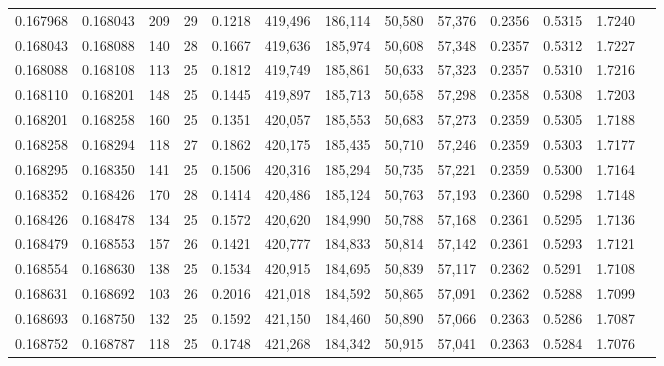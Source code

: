 \begin{tabular}{rrrrrrrrrrrrr}
0.167968 & 0.168043 & 209 &  29 &                                     0.1218 & 419,496 & 186,114 &  50,580 &  57,376 & 0.2356 & 0.5315 & 1.7240 \\
0.168043 & 0.168088 & 140 &  28 &                                     0.1667 & 419,636 & 185,974 &  50,608 &  57,348 & 0.2357 & 0.5312 & 1.7227 \\
0.168088 & 0.168108 & 113 &  25 &                                     0.1812 & 419,749 & 185,861 &  50,633 &  57,323 & 0.2357 & 0.5310 & 1.7216 \\
0.168110 & 0.168201 & 148 &  25 &                                     0.1445 & 419,897 & 185,713 &  50,658 &  57,298 & 0.2358 & 0.5308 & 1.7203 \\
0.168201 & 0.168258 & 160 &  25 &                                     0.1351 & 420,057 & 185,553 &  50,683 &  57,273 & 0.2359 & 0.5305 & 1.7188 \\
0.168258 & 0.168294 & 118 &  27 &                                     0.1862 & 420,175 & 185,435 &  50,710 &  57,246 & 0.2359 & 0.5303 & 1.7177 \\
0.168295 & 0.168350 & 141 &  25 &                                     0.1506 & 420,316 & 185,294 &  50,735 &  57,221 & 0.2359 & 0.5300 & 1.7164 \\
0.168352 & 0.168426 & 170 &  28 &                                     0.1414 & 420,486 & 185,124 &  50,763 &  57,193 & 0.2360 & 0.5298 & 1.7148 \\
0.168426 & 0.168478 & 134 &  25 &                                     0.1572 & 420,620 & 184,990 &  50,788 &  57,168 & 0.2361 & 0.5295 & 1.7136 \\
0.168479 & 0.168553 & 157 &  26 &                                     0.1421 & 420,777 & 184,833 &  50,814 &  57,142 & 0.2361 & 0.5293 & 1.7121 \\
0.168554 & 0.168630 & 138 &  25 &                                     0.1534 & 420,915 & 184,695 &  50,839 &  57,117 & 0.2362 & 0.5291 & 1.7108 \\
0.168631 & 0.168692 & 103 &  26 &                                     0.2016 & 421,018 & 184,592 &  50,865 &  57,091 & 0.2362 & 0.5288 & 1.7099 \\
0.168693 & 0.168750 & 132 &  25 &                                     0.1592 & 421,150 & 184,460 &  50,890 &  57,066 & 0.2363 & 0.5286 & 1.7087 \\
0.168752 & 0.168787 & 118 &  25 &                                     0.1748 & 421,268 & 184,342 &  50,915 &  57,041 & 0.2363 & 0.5284 & 1.7076 \\

\end{tabular}
